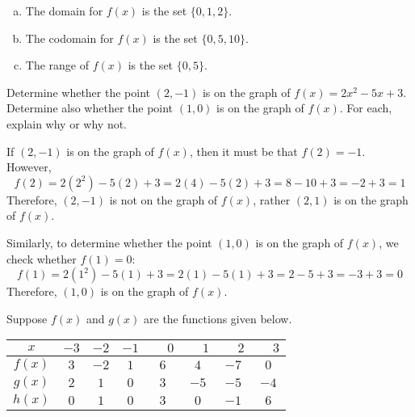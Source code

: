 \documentclass[11pt,letterpaper]{article}
\begin{document}
\sol
\begin{enumerate}[(a)]
\item The domain for $f(x)$ is the set $\{ 0, 1, 2 \}$. \pspace

\item The codomain for $f(x)$ is the set $\{ 0, 5, 10 \}$. \pspace

\item The range of $f(x)$ is the set $\{ 0, 5 \}$. 
\end{enumerate}



\newpage



 Determine whether the point $(2, -1)$ is on the graph of $f(x)= 2x^2 - 5x + 3$. Determine also whether the point $(1, 0)$ is on the graph of $f(x)$. For each, explain why or why not. \pspace

\sol If $(2, -1)$ is on the graph of $f(x)$, then it must be that $f(2)= -1$. However,
	\[
	f(2)= 2(2^2) - 5(2) + 3= 2(4) - 5(2) + 3= 8 - 10 + 3= -2 + 3= 1
	\]
Therefore, $(2, -1)$ is not on the graph of $f(x)$, rather $(2, 1)$ is on the graph of $f(x)$. \pspace

Similarly, to determine whether the point $(1, 0)$ is on the graph of $f(x)$, we check whether $f(1)= 0$:
	\[
	f(1)= 2(1^2) - 5(1) + 3= 2(1) - 5(1) + 3= 2 - 5 + 3= -3 + 3= 0
	\]
Therefore, $(1, 0)$ is on the graph of $f(x)$. 



\newpage



 Suppose $f(x)$ and $g(x)$ are the functions given below. 
        \begin{table}[!ht]
        \centering
        \begin{tabular}{| c || c | c | c | c | c | c | c |} \hline
	$x$ & $-3$ & $-2$ & $-1$ & $\phantom{-}0$ & $\phantom{-}1$ & $\phantom{-}2$ & $\phantom{-}3$ \\ \hline
	$f(x)$ & $3$ & $-2$ & $1$ & $6$ & $4$ & $-7$ & $0$ \\ \hline
	$g(x)$ & $2$ & $1$ & $0$ & $3$ & $-5$ & $-5$ & $-4$ \\ \hline
	$h(x)$ & $0$ & $1$ & $0$ & $3$ & $0$ & $-1$ & $6$ \\ \hline
        \end{tabular}
        \end{table}
\end{document}
